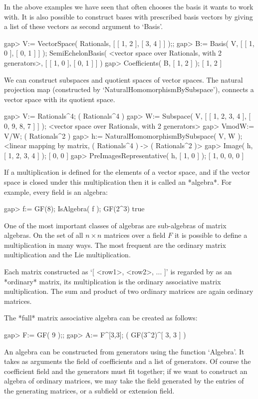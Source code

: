 In the above examples we have seen that {\GAP} often chooses the basis
it wants to work with. It is also possible to construct bases with
prescribed basis vectors by giving a list of these vectors as second argument 
to `Basis'.

\beginexample
gap> V:= VectorSpace( Rationals, [ [ 1, 2 ], [ 3, 4 ] ] );; 
gap> B:= Basis( V, [ [ 1, 0 ], [ 0, 1 ] ] );
SemiEchelonBasis( <vector space over Rationals, with 2 generators>,
[ [ 1, 0 ], [ 0, 1 ] ] )
gap> Coefficients( B, [ 1, 2 ] );
[ 1, 2 ]
\endexample

We can construct subspaces and quotient spaces of vector spaces. The
natural projection map (constructed by `NaturalHomomorphismBySubspace'),
connects a vector space with its quotient space.

\beginexample
gap> V:= Rationals^4;
( Rationals^4 )
gap> W:= Subspace( V, [ [ 1, 2, 3, 4 ], [ 0, 9, 8, 7 ] ] );
<vector space over Rationals, with 2 generators>
gap> VmodW:= V/W;
( Rationals^2 )
gap> h:= NaturalHomomorphismBySubspace( V, W );
<linear mapping by matrix, ( Rationals^4 ) -> ( Rationals^2 )>
gap> Image( h, [ 1, 2, 3, 4 ] );
[ 0, 0 ]
gap> PreImagesRepresentative( h, [ 1, 0 ] );
[ 1, 0, 0, 0 ]
\endexample



If a multiplication is defined for the elements of a vector space,
and if the vector space is closed under this multiplication then it is
called an *algebra*. For example, every field is an algebra:

\beginexample
gap> f:= GF(8); IsAlgebra( f );
GF(2^3)
true
\endexample

One of the most important classes of algebras are sub-algebras of matrix
algebras. On the set of all $n\times n$ matrices over a field $F$ 
it is possible to define a multiplication in many ways.
The most frequent are the ordinary matrix multiplication and the Lie
multiplication.

Each matrix constructed as `[ <row1>, <row2>, ... ]' is regarded by {\GAP}
as an *ordinary* matrix, its multiplication is the ordinary associative
matrix multiplication.
The sum and product of two ordinary matrices are again ordinary matrices.

The *full* matrix associative algebra can be created as follows:

\beginexample
gap> F:= GF( 9 );;
gap> A:= F^[3,3];
( GF(3^2)^[ 3, 3 ] )
\endexample

An algebra can be constructed from generators using the function `Algebra'.
It takes as arguments the field of coefficients and a list of generators.
Of course the coefficient field and the generators must fit together;
if we want to construct an algebra of ordinary matrices,
we may take the field generated by the entries of the generating matrices,
or a subfield or extension field.

